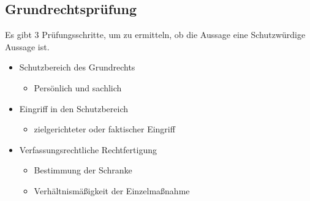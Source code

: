 \subsection{Grundrechtsprüfung}
Es gibt 3 Prüfungsschritte, um zu ermitteln, ob die Aussage eine Schutzwürdige Aussage ist.
\begin{itemize}
    \item Schutzbereich des Grundrechts
        \begin{itemize}
            \item Persönlich und sachlich
        \end{itemize}
    \item Eingriff in den Schutzbereich
        \begin{itemize}
            \item  zielgerichteter oder faktischer Eingriff
        \end{itemize}
     \item Verfassungsrechtliche Rechtfertigung
        \begin{itemize}
            \item Bestimmung der Schranke
            \item Verhältnismäßigkeit der Einzelmaßnahme
        \end{itemize}
\end{itemize}
%
%
%
%
%
